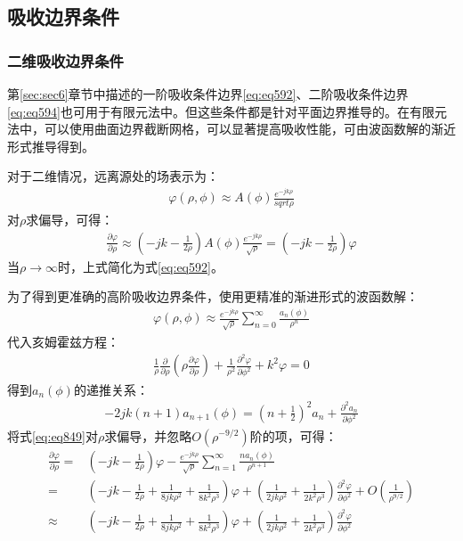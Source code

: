 \documentclass{article}
\numberwithin{equation}{section}
\begin{document}
\subsection{吸收边界条件}
\subsubsection{二维吸收边界条件}
第\ref{sec:sec6}章节中描述的一阶吸收条件边界\ref{eq:eq592}、二阶吸收条件边界\ref{eq:eq594}也可用于有限元法中。但这些条件都是针对平面边界推导的。在有限元法中，可以使用曲面边界截断网格，可以显著提高吸收性能，可由波函数解的渐近形式推导得到。\par
对于二维情况，远离源处的场表示为：
\begin{align}
    \label{eq:eq847}
    \varphi(\rho,\phi)\approx A(\phi)\frac{e^{-jk\rho}}{sqrt{\rho}}
\end{align}
对$\rho$求偏导，可得\textbf{\color{blue}{一阶吸收边界条件}}：
\begin{align}
    \label{eq:eq848}
    \frac{\partial\varphi}{\partial\rho}\approx\left(-jk-\frac{1}{2\rho}\right)A(\phi)\frac{e^{-jk\rho}}{\sqrt{\rho}}=\left(-jk-\frac{1}{2\rho}\right)\varphi
\end{align}
当$\rho\to\infty$时，上式简化为式\ref{eq:eq592}。\par
为了得到更准确的高阶吸收边界条件，使用更精准的渐进形式的波函数解：
\begin{align}
    \label{eq:eq849}
    \varphi(\rho,\phi)\approx\frac{e^{-jk\rho}}{\sqrt{\rho}}\sum_{n=0}^{\infty}\frac{a_n(\phi)}{\rho^n}
\end{align}
代入亥姆霍兹方程：
\begin{align}
    \label{eq:eq850}
    \frac{1}{\rho}\frac{\partial}{\partial\rho}\left(\rho\frac{\partial\varphi}{\partial\rho}\right)+\frac{1}{\rho^2}\frac{\partial^2\varphi}{\partial\phi^2}+k^2\varphi=0
\end{align}
得到$a_n(\phi)$的递推关系：
\begin{align}
    \label{eq:eq851}
    -2jk(n+1)a_{n+1}(\phi)=\left(n+\frac{1}{2}\right)^2a_n+\frac{\partial^2a_n}{\partial\phi^2}
\end{align}
将式\ref{eq:eq849}对$\rho$求偏导，并忽略$O(\rho^{-9/2})$阶的项，可得\textbf{\color{blue}{二阶吸收边界条件}}：
\begin{align}
    \label{eq:eq852}
    \frac{\partial\varphi}{\partial\rho}=&\left(-jk-\frac{1}{2\rho}\right)\varphi-\frac{e^{-jk\rho}}{\sqrt{\rho}}\sum_{n=1}^{\infty}\frac{na_n(\phi)}{\rho^{n+1}} \nonumber \\
                                        =&\left(-jk-\frac{1}{2\rho}+\frac{1}{8jk\rho^2}+\frac{1}{8k^2\rho^3}\right)\varphi+\left(\frac{1}{2jk\rho^2}+\frac{1}{2k^2\rho^3}\right)\frac{\partial^2\varphi}{\partial\phi^2}+O\left(\frac{1}{\rho^{9/2}}\right) \nonumber \\
                                        \approx&\left(-jk-\frac{1}{2\rho}+\frac{1}{8jk\rho^2}+\frac{1}{8k^2\rho^3}\right)\varphi+\left(\frac{1}{2jk\rho^2}+\frac{1}{2k^2\rho^3}\right)\frac{\partial^2\varphi}{\partial\phi^2}
\end{align}
\end{document}
